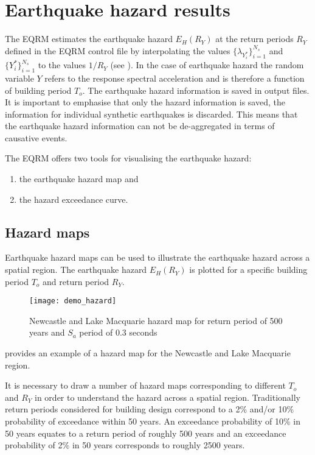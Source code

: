 \section{Earthquake hazard results}
\label{sec:risk-hzd-results} The EQRM estimates the earthquake
hazard $E_H(R_Y)$ at the return periods $R_Y$ defined in the
EQRM control file by    
interpolating the values $\{ \lambda_{Y_i^*}\}_{i=1}^{N_s}$ and
$\{Y_i^*\}_{i=1}^{N_s}$ to the values $1/R_Y$ (see
). In the case of earthquake hazard the
random variable $Y$ refers to the response spectral
acceleration and is
therefore a function of building period $T_o$. The earthquake
hazard information is saved in output files. It is important to
emphasise that only the hazard information is saved, the
information for individual synthetic earthquakes is discarded.
This means that the earthquake hazard information can not be
de-aggregated in terms of causative events.

The EQRM offers two tools for visualising the earthquake hazard:
\begin{enumerate}
\item the earthquake hazard map and \item the hazard exceedance
curve.
\end{enumerate}

\subsection{Hazard maps}

Earthquake hazard maps can be used to illustrate the earthquake
hazard across a spatial region. The earthquake hazard $E_H(R_Y)$
is plotted for a specific building period $T_o$ and return period
$R_Y$.
\begin{figure}
\texttt{[image: demo\_hazard]}
\caption{Newcastle and Lake Macquarie hazard map for return period
of 500 years and $S_a$ period of 0.3 seconds}
\label{fig:risk-hazardmap}
\end{figure}
 provides an example of a hazard map for
the Newcastle and Lake Macquarie region.

It is necessary to draw a number of hazard maps corresponding to
different $T_o$ and $R_Y$ in order to understand the hazard across
a spatial region. Traditionally return periods considered for
building design correspond to a 2\% and/or 10\% probability of
exceedance within 50 years. An exceedance probability of 10\% in
50 years equates to a return period of roughly 500 years and an
exceedance probability of 2\% in 50 years corresponds to roughly
2500 years.

